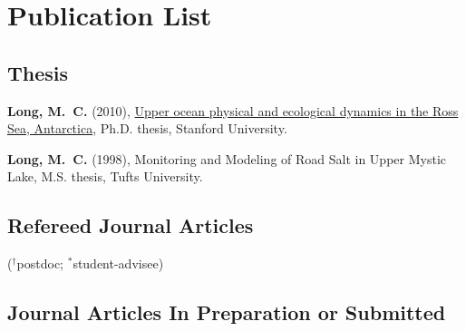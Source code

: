 \documentclass[11pt]{article}
\begin{document}
\section{Publication List}

\makeatletter
\renewcommand\@biblabel[1]{#1.}
\makeatother

\subsection*{Thesis}

\vspace{-1em}
\begin{thebibliography}{99}
\textbf{Long, M.~C.} (2010), \href{https://stacks.stanford.edu/file/druid:bx376fq2382/jua-kali-augmented.pdf}{Upper ocean physical and ecological dynamics in the {Ross Sea, Antarctica}}, Ph.D. thesis, Stanford University.

\textbf{Long, M.~C.} (1998),
Monitoring and Modeling of Road Salt in Upper Mystic Lake, M.S. thesis,
Tufts University.
\end{thebibliography}

\subsection*{Refereed Journal Articles}
($^\dagger$postdoc; $^*$student-advisee)

\vspace{-1.5em}

\nocite{*}




\subsection*{Journal Articles In Preparation or Submitted}
\vspace{-1em}
\end{document}

